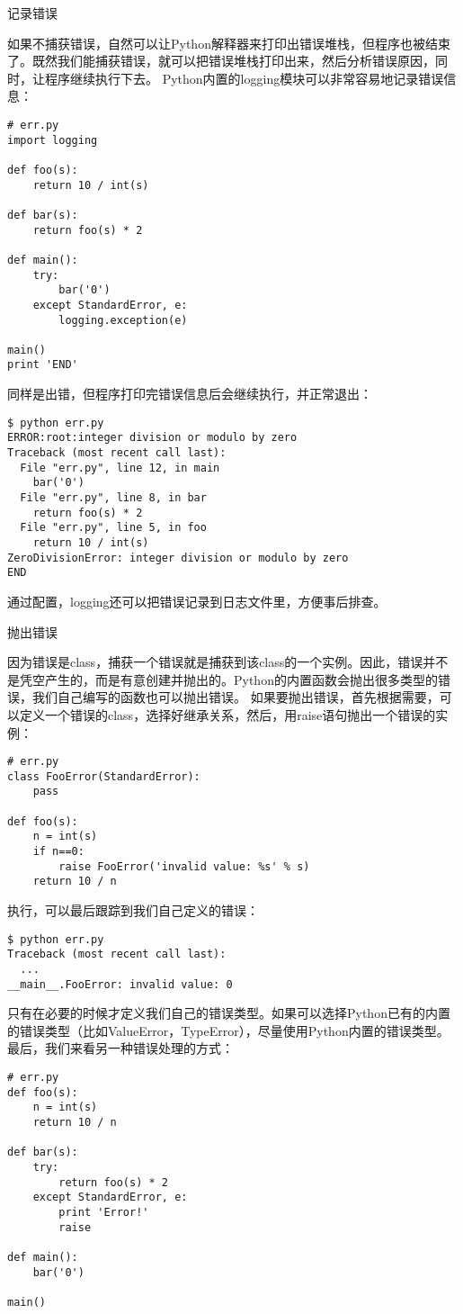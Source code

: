 \documentclass[twoside,11pt]{book}
\begin{document}
记录错误


如果不捕获错误，自然可以让Python解释器来打印出错误堆栈，但程序也被结束了。既然我们能捕获错误，就可以把错误堆栈打印出来，然后分析错误原因，同时，让程序继续执行下去。
Python内置的logging模块可以非常容易地记录错误信息：
\begin{lstlisting}
# err.py
import logging

def foo(s):
    return 10 / int(s)

def bar(s):
    return foo(s) * 2

def main():
    try:
        bar('0')
    except StandardError, e:
        logging.exception(e)

main()
print 'END'
\end{lstlisting}

同样是出错，但程序打印完错误信息后会继续执行，并正常退出：
\begin{lstlisting}
$ python err.py
ERROR:root:integer division or modulo by zero
Traceback (most recent call last):
  File "err.py", line 12, in main
    bar('0')
  File "err.py", line 8, in bar
    return foo(s) * 2
  File "err.py", line 5, in foo
    return 10 / int(s)
ZeroDivisionError: integer division or modulo by zero
END
\end{lstlisting}

通过配置，logging还可以把错误记录到日志文件里，方便事后排查。


抛出错误

因为错误是class，捕获一个错误就是捕获到该class的一个实例。因此，错误并不是凭空产生的，而是有意创建并抛出的。Python的内置函数会抛出很多类型的错误，我们自己编写的函数也可以抛出错误。
如果要抛出错误，首先根据需要，可以定义一个错误的class，选择好继承关系，然后，用raise语句抛出一个错误的实例：
\begin{lstlisting}
# err.py
class FooError(StandardError):
    pass

def foo(s):
    n = int(s)
    if n==0:
        raise FooError('invalid value: %s' % s)
    return 10 / n
\end{lstlisting}

执行，可以最后跟踪到我们自己定义的错误：

\begin{lstlisting}
$ python err.py
Traceback (most recent call last):
  ...
__main__.FooError: invalid value: 0
\end{lstlisting}

只有在必要的时候才定义我们自己的错误类型。如果可以选择Python已有的内置的错误类型（比如ValueError，TypeError），尽量使用Python内置的错误类型。
最后，我们来看另一种错误处理的方式：
\begin{lstlisting}
# err.py
def foo(s):
    n = int(s)
    return 10 / n

def bar(s):
    try:
        return foo(s) * 2
    except StandardError, e:
        print 'Error!'
        raise

def main():
    bar('0')

main()
\end{lstlisting}
\end{document}
